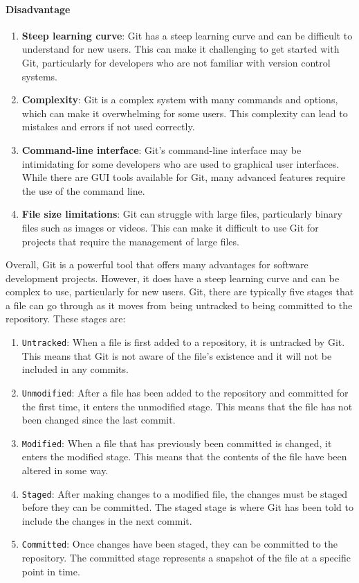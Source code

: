 \documentclass[10pt, a4paper]{article}
\begin{document}
\paragraph*{Disadvantage}
\begin{enumerate}
    \item \textbf{Steep learning curve}:
    Git has a steep learning curve and can be difficult to understand for new users. This can make it challenging to get started with Git, particularly for developers who are not familiar with version control systems.
    \item \textbf{Complexity}:
    Git is a complex system with many commands and options, which can make it overwhelming for some users. This complexity can lead to mistakes and errors if not used correctly.
    \item \textbf{Command-line interface}:
    Git's command-line interface may be intimidating for some developers who are used to graphical user interfaces. While there are GUI tools available for Git, many advanced features require the use of the command line.
    \item \textbf{File size limitations}:
    Git can struggle with large files, particularly binary files such as images or videos. This can make it difficult to use Git for projects that require the management of large files.
\end{enumerate}
Overall, Git is a powerful tool that offers many advantages for software development projects. However, it does have a steep learning curve and can be complex to use, particularly for new users.
Git, there are typically five stages that a file can go through as it moves from being untracked to being committed to the repository. These stages are:

\begin{enumerate}
    \item \texttt{Untracked}: When a file is first added to a repository, it is untracked by Git. This means that Git is not aware of the file's existence and it will not be included in any commits. 
    \item \texttt{Unmodified}: After a file has been added to the repository and committed for the first time, it enters the unmodified stage. This means that the file has not been changed since the last commit.
    \item \texttt{Modified}: When a file that has previously been committed is changed, it enters the modified stage. This means that the contents of the file have been altered in some way.
    \item \texttt{Staged}: After making changes to a modified file, the changes must be staged before they can be committed. The staged stage is where Git has been told to include the changes in the next commit.
    \item \texttt{Committed}: Once changes have been staged, they can be committed to the repository. The committed stage represents a snapshot of the file at a specific point in time.
\end{enumerate}
\end{document}

